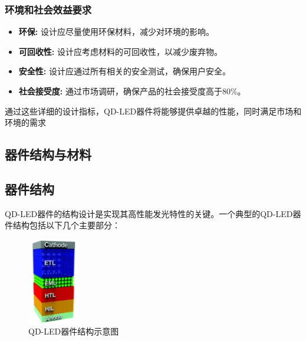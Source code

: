 \documentclass[12pt,hyperref,a4paper,UTF8]{ctexart}
\begin{document}
\subsubsection*{环境和社会效益要求}
\begin{itemize}
  \item \textbf{环保:} 设计应尽量使用环保材料，减少对环境的影响。
  \item \textbf{可回收性:} 设计应考虑材料的可回收性，以减少废弃物。
  \item \textbf{安全性:} 设计应通过所有相关的安全测试，确保用户安全。
  \item \textbf{社会接受度:} 通过市场调研，确保产品的社会接受度高于80\%。
\end{itemize}

通过这些详细的设计指标，QD-LED器件将能够提供卓越的性能，同时满足市场和环境的需求




\subsection{器件结构与材料}



\subsection*{器件结构}
QD-LED器件的结构设计是实现其高性能发光特性的关键。一个典型的QD-LED器件结构包括以下几个主要部分：

\begin{figure}[H]
  \centering
  \includegraphics[width=0.2\textwidth]{figures/fig/image8.png} %
  \caption{QD-LED器件结构示意图\cite{bang2021technology}}
\end{figure}
\end{document}
